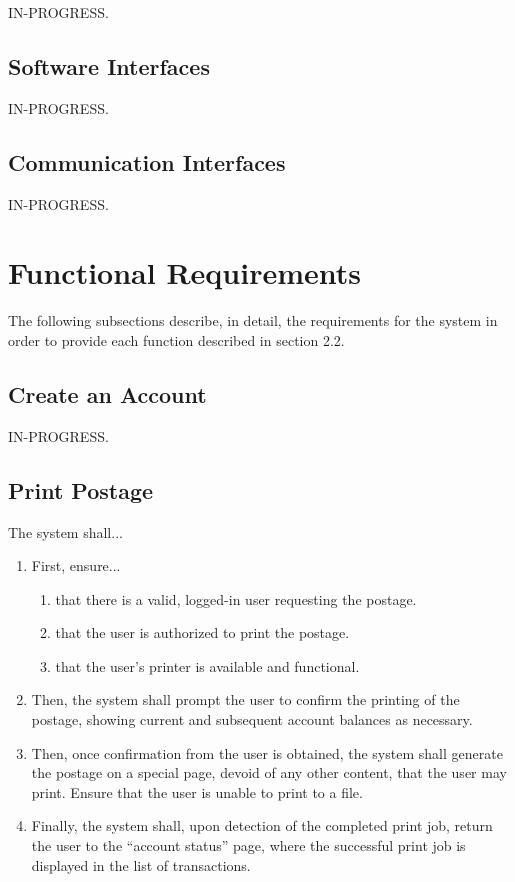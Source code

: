 \documentclass{scrreprt}
\begin{document}
IN-PROGRESS.

\subsection{Software Interfaces}

IN-PROGRESS.

\subsection{Communication Interfaces}

IN-PROGRESS.

\section{Functional Requirements}

The following subsections describe, in detail, the requirements for 
the system in order to provide each function described in section 
2.2.

\subsection{Create an Account}

IN-PROGRESS.

\subsection{Print Postage}

The system shall...

\begin{enumerate}
\item First, ensure...
\begin{enumerate}
\item that there is a valid, logged-in user requesting the postage.
\item that the user is authorized to print the postage.
\item that the user's printer is available and functional.
\end{enumerate}
\item Then, the system shall prompt the user to confirm the printing of the 
postage, showing current and subsequent account balances as necessary.
\item Then, once confirmation from the user is obtained, the system shall 
generate the postage on a special page, devoid of any other content, that the 
user may print. Ensure that the user is unable to print to a file.
\item Finally, the system shall, upon detection of the completed print job, 
return the user to the ``account status'' page, where the successful print job 
is displayed in the list of transactions.
\end{enumerate}
\end{document}

